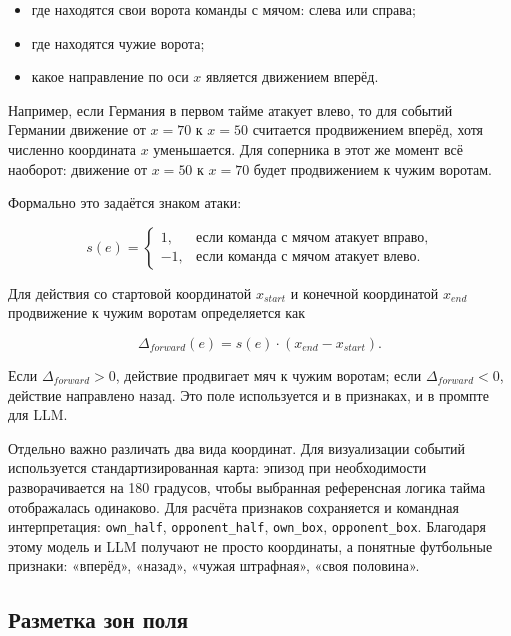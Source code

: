 \documentclass[a4paper,14pt]{extarticle}
\numberwithin{table}{section}
\numberwithin{figure}{section}
\numberwithin{equation}{section}
\begin{document}
\begin{itemize}
    \item где находятся свои ворота команды с мячом: слева или справа;
    \item где находятся чужие ворота;
    \item какое направление по оси $x$ является движением вперёд.
\end{itemize}

Например, если Германия в первом тайме атакует влево, то для событий Германии движение от $x=70$ к $x=50$ считается продвижением вперёд, хотя численно координата $x$ уменьшается. Для соперника в этот же момент всё наоборот: движение от $x=50$ к $x=70$ будет продвижением к чужим воротам.

Формально это задаётся знаком атаки:

\begin{equation}
    s(e) =
    \begin{cases}
    1, & \text{если команда с мячом атакует вправо},\\
    -1, & \text{если команда с мячом атакует влево}.
    \end{cases}
    \label{eq:attack-sign}
\end{equation}

Для действия со стартовой координатой $x_{start}$ и конечной координатой $x_{end}$ продвижение к чужим воротам определяется как

\begin{equation}
    \Delta_{forward}(e) = s(e) \cdot (x_{end} - x_{start}).
    \label{eq:forward-delta}
\end{equation}

Если $\Delta_{forward} > 0$, действие продвигает мяч к чужим воротам; если $\Delta_{forward} < 0$, действие направлено назад. Это поле используется и в признаках, и в промпте для LLM.

Отдельно важно различать два вида координат. Для визуализации событий используется стандартизированная карта: эпизод при необходимости разворачивается на 180 градусов, чтобы выбранная референсная логика тайма отображалась одинаково. Для расчёта признаков сохраняется и командная интерпретация: \texttt{own\_half}, \texttt{opponent\_half}, \texttt{own\_box}, \texttt{opponent\_box}. Благодаря этому модель и LLM получают не просто координаты, а понятные футбольные признаки: «вперёд», «назад», «чужая штрафная», «своя половина».

\subsection{Разметка зон поля}
\end{document}
